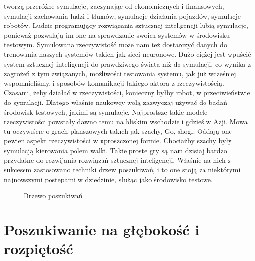 tworzą przeróżne symulacje, zaczynając od ekonomicznych i finansowych, symulacji zachowania ludzi i tłumów, symulacje działania pojazdów, symulacje robotów. Ludzie programujący rozwiązania sztucznej inteligencji lubią symulacje, ponieważ pozwalają im one na sprawdzanie swoich systemów w środowisku testowym. Symulowana rzeczywistość może nam też dostarczyć danych do trenowania naszych systemów takich jak sieci neuronowe. Dużo ciężej jest wpuścić system sztucznej inteligencji do prawdziwego świata niż do symulacji, co wynika z zagrożeń z tym związanych, możliwości testowania systemu, jak już wcześniej wspomnieliśmy, i sposobów komunikacji takiego aktora z rzeczywistością. Czasami, żeby działać w rzeczywistości, konieczny byłby robot, w przeciwieństwie do symulacji. Dlatego właśnie naukowcy wolą zazwyczaj używać do badań środowisk testowych, jakimi są symulacje. Najprostsze takie modele rzeczywistości powstały dawno temu na bliskim wschodzie i gdzieś w Azji. Mowa tu oczywiście o grach planszowych takich jak szachy, Go, shogi. Oddają one pewien aspekt rzeczywistości w uproszczonej formie. Chociażby szachy były symulacją kierowania polem walki. Takie proste gry są nam dzisiaj bardzo przydatne do rozwijania rozwiązań sztucznej inteligencji. Właśnie na nich z sukcesem zastosowano techniki drzew poszukiwań, i to one stoją za niektórymi najnowszymi postępami w dziedzinie, służąc jako środowisko testowe.

\clearpage
\begin{figure}[H]
\centering

\caption{Drzewo poszukiwań}
\end{figure}
\clearpage

\section{Poszukiwanie na głębokość i rozpiętość}

